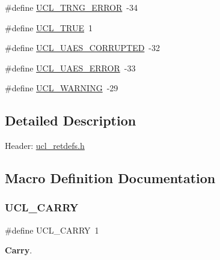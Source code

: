 \begin{DoxyCompactItemize}
\item
\#define \hyperlink{group___u_c_l___r_e_t_u_r_n_gabfb30f7a53ff4e919deefe774bfd3e1f}{U\+C\+L\+\_\+\+T\+R\+N\+G\+\_\+\+E\+R\+R\+OR}~-\/34
\item
\#define \hyperlink{group___u_c_l___r_e_t_u_r_n_ga4498f15eb17d0532d8c3d1db72502f09}{U\+C\+L\+\_\+\+T\+R\+UE}~1
\item
\#define \hyperlink{group___u_c_l___r_e_t_u_r_n_gaba7ba8db070222df831530fc3e812776}{U\+C\+L\+\_\+\+U\+A\+E\+S\+\_\+\+C\+O\+R\+R\+U\+P\+T\+ED}~-\/32
\item
\#define \hyperlink{group___u_c_l___r_e_t_u_r_n_ga2bc1728bb7048231ec416e9b5abeaa11}{U\+C\+L\+\_\+\+U\+A\+E\+S\+\_\+\+E\+R\+R\+OR}~-\/33
\item
\#define \hyperlink{group___u_c_l___r_e_t_u_r_n_ga7ad179c2a68343f3c8275ae412688a6d}{U\+C\+L\+\_\+\+W\+A\+R\+N\+I\+NG}~-\/29
\end{DoxyCompactItemize}


\subsection{Detailed Description}
\begin{DoxyParagraph}{Header\+:}
\hyperlink{ucl__retdefs_8h}{ucl\+\_\+retdefs.\+h }
\end{DoxyParagraph}


\subsection{Macro Definition Documentation}
\mbox{\label{group___u_c_l___r_e_t_u_r_n_ga0dce5f26cc3acf0bcca51853edc2b10f}}
\subsubsection{\texorpdfstring{U\+C\+L\+\_\+\+C\+A\+R\+RY}{UCL\_CARRY}}
{\footnotesize\ttfamily \#define U\+C\+L\+\_\+\+C\+A\+R\+RY~1}

{\bfseries Carry}. \mbox{\label{group___u_c_l___r_e_t_u_r_n_gafc7aaea99d505ed3f41233839c2cb931}}
